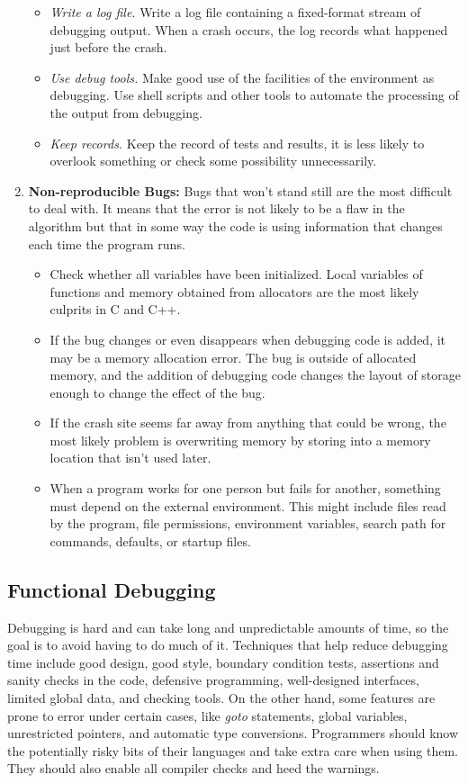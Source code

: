 \documentclass[draftclsnofoot,journal,onecolumn,12pt]{IEEEtran}
\begin{document}
\begin{enumerate}
\begin{itemize}
    \item \textit{Write a log file.} Write a log file containing a fixed-format stream of debugging output. When a crash occurs, the log records what happened just before the crash.
    \item \textit{Use debug tools.} Make good use of the facilities of the environment as debugging. Use shell scripts and other tools to automate the processing of the output from debugging.
    \item \textit{Keep records.} Keep the record of tests and results, it is less likely to overlook something or check some possibility unnecessarily.
    \end{itemize}
  \item \textbf{Non-reproducible Bugs:} Bugs that won't stand still are the most difficult to deal with. It means that the error is not likely to be a flaw in the algorithm but that in some way the code is using information that changes each time the program runs.
      \begin{itemize}
        \item Check whether all variables have been initialized. Local variables of functions and memory obtained from allocators are the most likely culprits in C and C++.
        \item If the bug changes or even disappears when debugging code is added, it may be a memory allocation error. The bug is outside of allocated memory, and the addition of debugging code changes the layout of storage enough to change the effect of the bug.
        \item If the crash site seems far away from anything that could be wrong, the most likely problem is overwriting memory by storing into a memory location that isn't used later.
        \item When a program works for one person but fails for another, something must depend on the external environment. This might include files read by the program, file permissions, environment variables, search path for commands, defaults, or startup files.
      \end{itemize}
\end{enumerate}

\subsection{Functional Debugging}

Debugging is hard and can take long and unpredictable amounts of time, so the goal is to avoid having to do much of it. Techniques that help reduce debugging time include good design, good style, boundary condition tests, assertions and sanity checks in the code, defensive programming, well-designed interfaces, limited global data, and checking tools. On the other hand, some features are prone to error under certain cases, like \textit{goto} statements, global variables, unrestricted pointers, and automatic type conversions. Programmers should know the potentially risky bits of their languages and take extra care when using them. They should also enable all compiler checks and heed the warnings.
\end{document}
